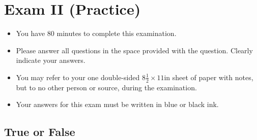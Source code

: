 \chapter{Exam II (Practice)}
\label{ch:examii-practice}

\begin{preamble}
\begin{itemize}
\item You have 80 minutes to complete this examination.
\item Please answer all questions in the space provided with the
  question.  Clearly indicate your answers.
\item You may refer to your one double-sided $8\frac{1}{2} \times 11$in
  sheet of paper with notes, but to no other person or source, during the
  examination.

\item Your answers for this exam must be written in blue or black ink.

\end{itemize}
\end{preamble}


\section{True or False}

